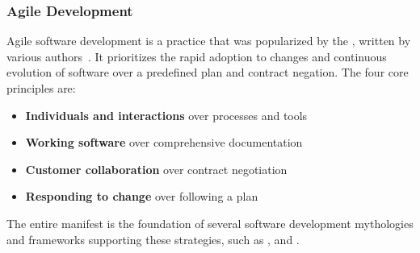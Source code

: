 \documentclass[12pt, a4paper]{article}
\begin{document}
        \subsubsection{Agile Development}
        Agile software development is a practice that was popularized by the , written by various authors~\cite{manifesto}. It prioritizes the rapid adoption to changes and continuous evolution of software over a predefined plan and contract negation.
        The four core principles are:

        \begin{itemize}[label=\(\star\)]
            \setlength\itemsep{0em}
            \item \textbf{Individuals and interactions} over processes and tools
            \item \textbf{Working software} over comprehensive documentation
            \item \textbf{Customer collaboration} over contract negotiation
            \item \textbf{Responding to change} over following a plan
        \end{itemize}

        \noindent The entire manifest is the foundation of several software development mythologies and frameworks supporting these strategies, such as ,  and .
\end{document}
